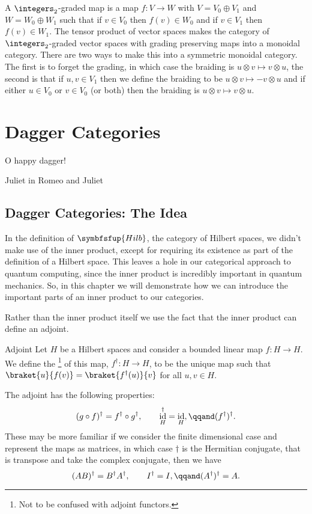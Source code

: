 \documentclass[fleqn]{NotesClass}
\makeatletter
\newcommand{\c@egory}[1]{\symbfsfup{#1}}
\newcommand{\Hilb}{\c@egory{Hilb}}
\DeclareMathOperator{\id}{id}
\newcommand{\hermit}{\dagger}
\makeatother
\begin{document}
\begin{exm}{}{}
\begin{itemize}
            A \(\integers_2\)-graded map is a map \(f\colon V \to W\) with \(V = V_0 \oplus V_1\) and \(W = W_0 \oplus W_1\) such that if \(v \in V_0\) then \(f(v) \in W_0\) and if \(v \in V_1\) then \(f(v) \in W_1\).
            The tensor product of vector spaces makes the category of \(\integers_2\)-graded vector spaces with grading preserving maps into a monoidal category.
            There are two ways to make this into a symmetric monoidal category.
            The first is to forget the grading, in which case the braiding is \(u \otimes v \mapsto v \otimes u\), the second is that if \(u, v \in V_1\) then we define the braiding to be \(u \otimes v \mapsto -v \otimes u\) and if either \(u \in V_0\) or \(v \in V_0\) (or both) then the braiding is \(u \otimes v \mapsto v \otimes u\).
        \end{itemize}
    \end{exm}
    
    \chapter{Dagger Categories}
    \epigraph{O happy dagger!}{Juliet in Romeo and Juliet}
    
    \section{Dagger Categories: The Idea}
    In the definition of \(\Hilb\), the category of Hilbert spaces, we didn't make use of the inner product, except for requiring its existence as part of the definition of a Hilbert space.
    This leaves a hole in our categorical approach to quantum computing, since the inner product is incredibly important in quantum mechanics.
    So, in this chapter we will demonstrate how we can introduce the important parts of an inner product to our categories.
    
    Rather than the inner product itself we use the fact that the inner product can define an adjoint.
    \begin{dfn}{Adjoint}{}
        Let \(H\) be a Hilbert spaces and consider a bounded linear map \(f \colon H \to H\).
        We define the \footnote{Not to be confused with adjoint functors.} of this map, \(f^{\dagger} \colon H \to H\), to be the unique map such that \(\braket{u}{f(v)} = \braket{f^{\hermit}(u)}{v}\) for all \(u, v \in H\).
    \end{dfn}
    
    The adjoint has the following properties:
    \begin{equation}
        (g \circ f)^\dagger = f^\dagger \circ g^\dagger, \qquad \id_H^\dagger = \id_H, \qqand (f^\dagger)^\dagger.
    \end{equation}
    These may be more familiar if we consider the finite dimensional case and represent the maps as matrices, in which case \(\dagger\) is the Hermitian conjugate, that is transpose and take the complex conjugate, then we have
    \begin{equation}
        (AB)^{\dagger} = B^\dagger A^\dagger, \qquad I^\dagger = I, \qqand (A^\dagger)^\dagger = A.
    \end{equation}
    
\end{document}
